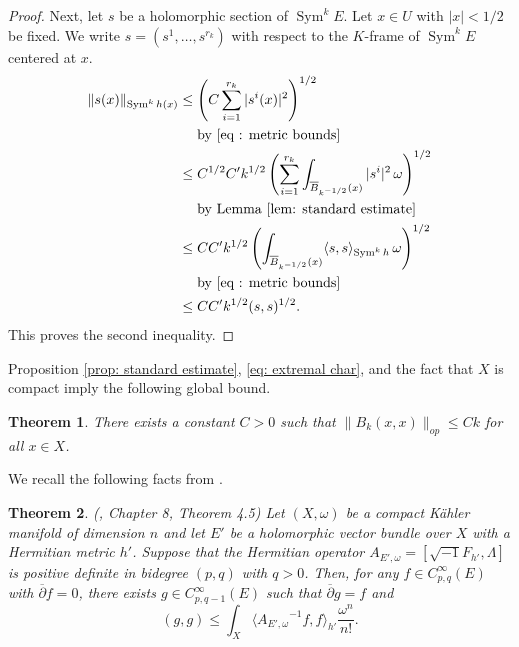 \documentclass{amsart}
\newtheorem{thm}{Theorem}[section]
\theoremstyle{definition}
\theoremstyle{remark}
\numberwithin{equation}{section}
\DeclareMathOperator{\Sym}{Sym}
\begin{document}
\begin{proof}
Next, let $s$ be a holomorphic section of $\Sym^kE$. Let $x \in U$ with $|x| < 1/2$ be fixed. We write $s = (s^1, \dotsc, s^{r_k})$ with respect to the $K$-frame of $\Sym^kE$ centered at $x$. 
\begin{align*}
\|s(x)\|_{\Sym^k h(x)} & \leq  \left ( C \sum_{i=1}^{r_k} |s^i(x)|^2 \right )^{1/2}  \\
    & \hspace{10pt} \text{ by \eqref{eq : metric bounds}} \\
    & \leq C^{1/2} C' k^{1/2} \left ( \sum_{i=1}^{r_k}\int_{\overline{B}_{k^{-1/2}}(x)}  |s^i|^2 \, \omega \right )^{1/2} \\
    & \hspace{10pt} \text{ by Lemma \ref{lem: standard estimate}} \\
    & \leq CC'k^{1/2} \left (\int_{\overline{B}_{k^{-1/2}}(x)} \langle s, s \rangle_{\Sym^k h} \, \omega \right )^{1/2} \\
    & \hspace{10pt} \text{ by \eqref{eq : metric bounds}} \\
    & \leq CC'k^{1/2} (s,s)^{1/2}.
\end{align*}
This proves the second inequality.
\end{proof}



Proposition \ref{prop: standard estimate}, \eqref{eq: extremal char}, and the fact that $X$ is compact imply the following global bound.
\begin{thm} \label{thm: global bound}
There exists a constant $C > 0$ such that $\|B_k(x,x)\|_{op} \leq Ck$ for all $x \in X$.
\end{thm}



We recall the following facts from \cite{D}. 

\begin{thm} \textnormal{(\cite{D}, Chapter 8, Theorem 4.5)} \label{thm: Hormander} 
Let $(X,\omega)$ be a compact K\"ahler manifold of dimension $n$ and let $E'$ be a holomorphic vector bundle over $X$ with a Hermitian metric $h'$. Suppose that the Hermitian operator $A_{E',\omega} = [\sqrt{-1} F_{h'}, \Lambda]$ is positive definite in bidegree $(p,q)$ with $q > 0$. Then, for any $f \in C^{\infty}_{p,q}(E)$ with $\overline{\partial}f = 0$, there exists $g \in C^\infty_{p,q-1}(E)$ such that $\overline{\partial}g = f$ and
$$
(g,g) \leq \int_X \langle {A_{E',\omega}}^{-1}f,f \rangle_{h'} \frac{\omega^n}{n!}.
$$
\end{thm}
\end{document}
